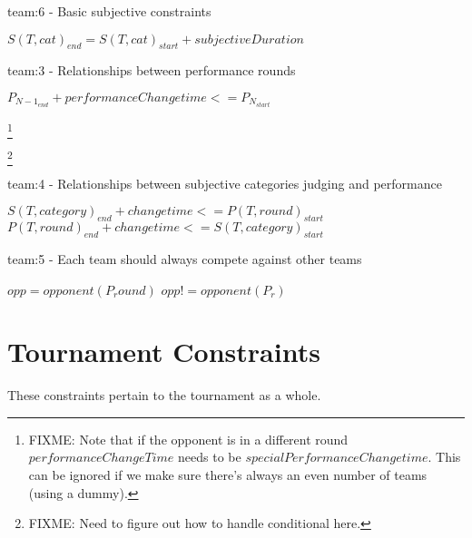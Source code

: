 \documentclass[letterpaper,11pt]{report}
\newcommand{\doccomment}[3]%
{\marginpar{\textcolor{#2}{\bf #1}}%
\footnote{{\color{#2}#3}}%
}
\newcommand{\doccomment}[3]{}
\newcommand{\jpscomment}[1]%
{\doccomment{SCHEWE}{Bittersweet}{#1}}
\begin{document}
\begin{algorithm}
\caption{team:6 - Basic subjective constraints}
\begin{algorithmic}
  \STATE $S(T, cat)_{end} = S(T, cat)_{start} + subjectiveDuration$
\ENDFOR
\end{algorithmic}
\end{algorithm}

\begin{algorithm}
\caption{team:3 - Relationships between performance rounds}
\begin{algorithmic}
  \STATE $P_{{N-1}_{end}} + performanceChangetime <= P_{N_{start}}$
\ENDFOR
\end{algorithmic}
\end{algorithm}
\jpscomment{FIXME: Note that if the opponent is in a different round
  $performanceChangeTime$ needs to be
  $specialPerformanceChangetime$. This can be ignored if we make sure
  there's always an even number of teams (using a dummy).}


\FloatBarrier
\jpscomment{FIXME: Need to figure out how to handle conditional here.}
\begin{algorithm}
\caption{team:4 - Relationships between subjective categories judging and performance}
\begin{algorithmic}
      \STATE $S(T, category)_{end} + changetime <= P(T, round)_{start}$
    \ELSE
      \STATE $P(T, round)_{end} + changetime <= S(T, category)_{start}$
    \ENDIF
  \ENDFOR
\ENDFOR
\end{algorithmic}
\end{algorithm}

\begin{algorithm}
\caption{team:5 - Each team should always compete against other teams}
\begin{algorithmic}
  \STATE $opp = opponent(P_round)$
    \STATE $opp != opponent(P_r)$
  \ENDFOR
\ENDFOR
\end{algorithmic}
\end{algorithm}


\FloatBarrier
\section{Tournament Constraints}
These constraints pertain to the tournament as a whole.
\end{document}
